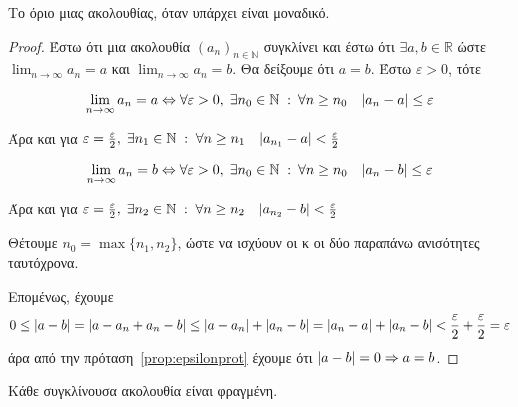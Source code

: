 \begin{mybox2}
  \begin{thm}
    Το όριο μιας ακολουθίας, όταν υπάρχει είναι μοναδικό.
  \end{thm}
\end{mybox2}
\begin{proof}
\item {}
  Έστω ότι μια ακολουθία $ (a_{n})_{n \in \mathbb{N}} $ συγκλίνει και έστω ότι 
  $ \exists a,b \in \mathbb{R} $ ώστε $ \lim_{n \to \infty} a_{n} = a $  και $ \lim_{n \to
  \infty} a_{n} = b $. Θα δείξουμε ότι $ a=b $. Έστω $ \varepsilon >0 $, τότε

  \[ 
    \lim_{n \to \infty} a_{n} = a \Leftrightarrow \forall 
    \varepsilon > 0, \; \exists n_{0} \in \mathbb{N} \; : \: 
    \forall n \geq n_{0} \quad \abs{a_{n}- a} \leq \varepsilon 
  \]

  Άρα και για $ \varepsilon = \frac{\varepsilon}{2}, \; \exists n_{1} \in 
  \mathbb{N} \; : \; \forall n \geq n_{1} \quad \abs{a_{n_{1}} - a} 
  < \frac{\varepsilon}{2}  $

  \[ 
    \lim_{n \to \infty} a_{n} = b \Leftrightarrow \forall 
    \varepsilon > 0, \; \exists n_{0} \in \mathbb{N} \; : \: 
    \forall n \geq n_{0} \quad \abs{a_{n}- b} \leq \varepsilon 
  \]

  Άρα και για $ \varepsilon = \frac{\varepsilon}{2}, \; \exists n_{2} \in 
  \mathbb{N} \; : \; \forall n \geq n_{2}  \quad 
  \abs{a_{n_{2}} - b} < \frac{\varepsilon}{2}  $

  Θέτουμε $ n_{0} = \max \{ n_{1}, n_{2} \} $, ώστε να ισχύουν οι 
  κ οι δύο παραπάνω ανισότητες ταυτόχρονα. 

  Επομένως, έχουμε 
  \[
    0 \leq \abs{a-b} = \abs{a- a_{n}+ a_{n}- b} \leq 
    \abs{a- a_{n}} + \abs{a_{n}- b} = \abs{a_{n}-a} + \abs{a_{n}-b} < \frac{\varepsilon}{2} + 
    \frac{\varepsilon}{2} = \varepsilon 
  \] 
  άρα από την πρόταση~\ref{prop:epsilonprot} έχουμε ότι 
  $ \abs{a-b} = 0 \Rightarrow a=b $.
\end{proof}


\begin{mybox2}
  \begin{thm}
    Κάθε συγκλίνουσα ακολουθία είναι φραγμένη.
  \end{thm}
\end{mybox2}

